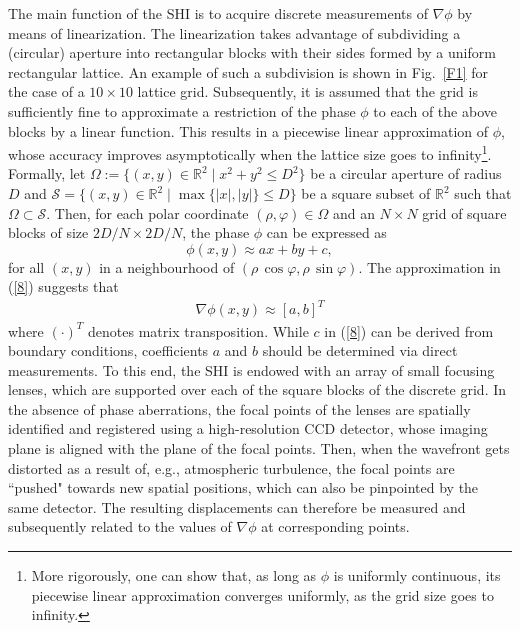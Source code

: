 \pdfoutput=1 \documentclass[journal]{IEEEtran}
\begin{document}
The main function of the SHI is to acquire discrete measurements of $\nabla \phi$ by means of linearization. The linearization takes advantage of subdividing a (circular) aperture into rectangular blocks with their sides formed by a uniform rectangular lattice. An example of such a subdivision is shown in Fig.~\ref{F1} for the case of a $10 \times 10$ lattice grid. Subsequently, it is assumed that the grid is sufficiently fine to approximate a restriction of the phase $\phi$ to each of the above blocks by a linear function. This results in a piecewise linear approximation of $\phi$, whose accuracy improves asymptotically when the lattice size goes to infinity\footnote{More rigorously, one can show that, as long as $\phi$ is uniformly continuous, its piecewise linear approximation converges uniformly, as the grid size goes to infinity.}. Formally, let $\Omega := \{(x,y) \in \mathbb{R}^2 \mid x^2+y^2 \le D^2\}$ be a circular aperture of radius $D$ and $\mathcal{S} = \{(x,y) \in \mathbb{R}^2 \mid \max\{|x|,|y|\} \le D \}$ be a square subset of $\mathbb{R}^2$ such that $\Omega \subset \mathcal{S}$. Then, for each polar coordinate $(\rho,\varphi) \in \Omega$ and an $N \times N$ grid of square blocks of size $2 D / N \times 2 D / N$, the phase $\phi$ can be expressed as
\begin{equation} \label{8}
\phi(x,y) \approx ax + by + c,
\end{equation}
for all $(x,y)$ in a neighbourhood of $(\rho \, \cos \varphi, \rho \, \sin \varphi)$. The approximation in (\ref{8}) suggests that
\begin{equation} \label{9}
\begin{split}
\nabla\phi(x,y) \approx [a, b]^T
\end{split}
\end{equation}
where $(\cdot)^T$ denotes matrix transposition. While $c$ in (\ref{8}) can be derived from boundary conditions, coefficients $a$ and $b$ should be determined via direct measurements. To this end, the SHI is endowed with an array of small focusing lenses, which are supported over each of the square blocks of the discrete grid. In the absence of phase aberrations, the focal points of the lenses are spatially identified and registered using a high-resolution CCD detector, whose imaging plane is aligned with the plane of the focal points. Then, when the wavefront gets distorted as a result of, e.g., atmospheric turbulence, the focal points are ``pushed" towards new spatial positions, which can also be pinpointed by the same detector. The resulting displacements can therefore be measured and subsequently related to the values of $\nabla \phi$ at corresponding points.
\end{document}
